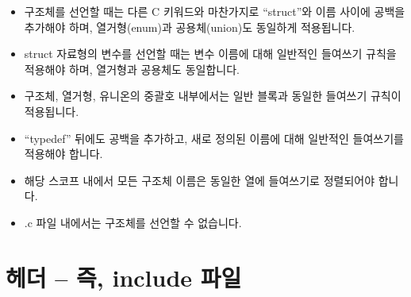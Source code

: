 \documentclass{42-ko}
\begin{document}
        \begin{itemize}

            \item 구조체를 선언할 때는 다른 C 키워드와 마찬가지로 ``struct''와
              이름 사이에 공백을 추가해야 하며, 열거형(enum)과 공용체(union)도
              동일하게 적용됩니다.

            \item struct 자료형의 변수를 선언할 때는 변수 이름에 대해 일반적인
              들여쓰기 규칙을 적용해야 하며, 열거형과 공용체도 동일합니다.

            \item 구조체, 열거형, 유니온의 중괄호 내부에서는 일반 블록과
              동일한 들여쓰기 규칙이 적용됩니다.

            \item ``typedef'' 뒤에도 공백을 추가하고, 새로 정의된 이름에 대해
              일반적인 들여쓰기를 적용해야 합니다.

            \item 해당 스코프 내에서 모든 구조체 이름은 동일한 열에 들여쓰기로
              정렬되어야 합니다.

            \item .c 파일 내에서는 구조체를 선언할 수 없습니다.

        \end{itemize}
        \newpage


    \section{헤더 – 즉, include 파일}
\end{document}
